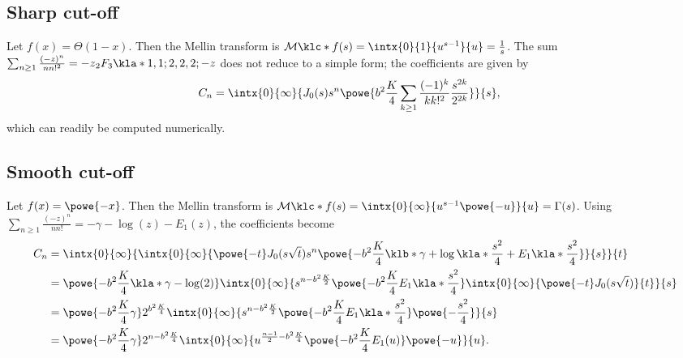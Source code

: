 \documentclass[english, parskip=full]{scrartcl}
\begin{document}
\subsection{Sharp cut-off}
Let $f(x)=\Theta(1-x)$.
Then the Mellin transform is $\mathcal{M}\klc*{f}(s) = \intx{0}{1}{u^{s-1}}{u} = \frac{1}{s}$.
The sum $\sum_{n\ge 1} \frac{(-z)^n}{nn!^2} = -z {}_2F_3\kla*{1,1;2,2,2;-z}$ does not reduce to a simple form; the coefficients are given by
\begin{align}
C_n &= \intx{0}{\infty}{J_0(s) s^n \powe{b^2 \frac{K}{4} \sum_{k\ge 1} \frac{(-1)^k}{kk!^2} \frac{s^{2k}}{2^{2k}} } }{s},
\end{align}
which can readily be computed numerically.
\subsection{Smooth cut-off}
Let $f(x) = \powe{-x}$.
Then the Mellin transform is $\mathcal{M}\klc*{f}(s) = \intx{0}{\infty}{u^{s-1} \powe{-u}}{u} = \Gamma(s)$. 
Using $\sum_{n\ge 1} \frac{(-z)^n}{n n!} = -\gamma - \log(z) - E_1(z)$, the coefficients become
\begin{align}
C_n &= \intx{0}{\infty}{ \intx{0}{\infty}{\powe{-t} J_0(s\sqrt{t}) s^n \powe{-b^2 \frac{K}{4} \klb*{\gamma + \log\kla*{\frac{s^2}{4}} + E_1\kla*{\frac{s^2}{4}}} } }{s} }{t}\\
&= \powe{-b^2 \frac{K}{4}\kla*{\gamma - \log(2)}} \intx{0}{\infty}{ s^{n - b^2 \frac{K}{2}} \powe{-b^2 \frac{K}{4} E_1\kla*{\frac{s^2}{4}}} \intx{0}{\infty}{\powe{-t} J_0(s\sqrt{t})}{t} }{s}\\
&= \powe{-b^2 \frac{K}{4}\gamma} 2^{b^2 \frac{K}{4}} \intx{0}{\infty}{ s^{n - b^2 \frac{K}{2}} \powe{-b^2 \frac{K}{4} E_1\kla*{\frac{s^2}{4}}} \powe{-\frac{s^2}{4}} }{s}\\
&= \powe{-b^2 \frac{K}{4}\gamma} 2^{n - b^2 \frac{K}{4}} \intx{0}{\infty}{ u^{\frac{n-1}{2} - b^2 \frac{K}{4}} \powe{-b^2 \frac{K}{4} E_1(u)} \powe{-u} }{u}.
\end{align}
\end{document}
